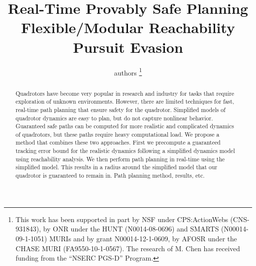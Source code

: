 \documentclass[letterpaper, 10pt, conference]{ieeeconf}      %
\title{\LARGE \bf Real-Time Provably Safe Planning Flexible/Modular Reachability Pursuit Evasion}
\author{authors
\thanks{\color{red}This work has been supported in part by NSF under CPS:ActionWebs (CNS-931843), by ONR under the HUNT (N0014-08-0696) and SMARTS (N00014-09-1-1051) MURIs and by grant N00014-12-1-0609, by AFOSR under the CHASE MURI (FA9550-10-1-0567). The research of M. Chen has received funding from the ``NSERC PGS-D'' Program.}
}
\begin{document}
\maketitle
\thispagestyle{empty}
\pagestyle{empty}

\begin{abstract}
Quadrotors have become very popular in research and industry for tasks that require exploration of unknown environments. However, there are limited techniques for fast, real-time path planning that ensure safety for the quadrotor. Simplified models of quadrotor dynamics are easy to plan, but do not capture nonlinear behavior. Guaranteed safe paths can be computed for more realistic and complicated dynamics of quadrotors, but these paths require heavy computational load. We propose a method that combines these two approaches. First we precompute a guaranteed tracking error bound for the realistic dynamics following a simplified dynamics model using reachability analysis. We then perform path planning in real-time using the simplified model. This results in a radius around the simplified model that our quadrotor is guaranteed to remain in.  \color{red} Path planning method, results, etc.
\end{abstract}




















\end{document}
